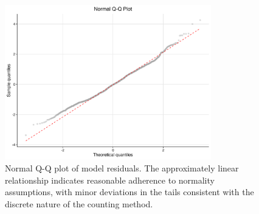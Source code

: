 \begin{figure}[htbp]
\centering
\includegraphics[width=0.8\textwidth]{supplemental/results/thesis_exports/figures/qq_plot.png}
\caption{Normal Q-Q plot of model residuals. The approximately linear relationship indicates reasonable adherence to normality assumptions, with minor deviations in the tails consistent with the discrete nature of the counting method.}
\label{fig:qqplot}
\end{figure}
